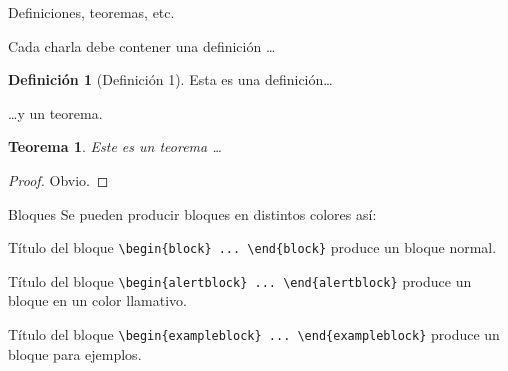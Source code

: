 \documentclass[dvipsnames,xcolor=x11names]{beamer}
\theoremstyle{plain}
\newtheorem{teorema}{Teorema}
\theoremstyle{definition}
\newtheorem{definicion}{Definici\'on}
\begin{document}
\begin{frame}{Definiciones, teoremas, etc.}

   Cada charla debe contener una definici\'on \dots
   \begin{definicion}[Definición 1]
      Esta es una definición\dots
   \end{definicion}
   \dots y un teorema.
   \begin{teorema}
      Este es un teorema \dots
   \end{teorema}
   \begin{proof}
      Obvio.
   \end{proof}
\end{frame}

\begin{frame}[fragile]{Bloques}
   Se pueden producir bloques en distintos colores as\'i:

   \begin{block}{T\'itulo del bloque}
      \verb+\begin{block} ... \end{block}+
      produce un bloque normal.
   \end{block}

   \begin{alertblock}{T\'itulo del bloque}
      \verb+\begin{alertblock} ... \end{alertblock}+
      produce un bloque en un color llamativo.
   \end{alertblock}

   \begin{exampleblock}{T\'itulo del bloque}
      \verb+\begin{exampleblock} ... \end{exampleblock}+
      produce un bloque para ejemplos.
   \end{exampleblock}

\end{frame}
\end{document}
